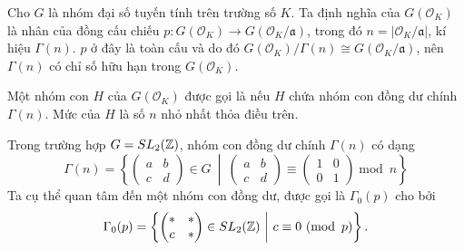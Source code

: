 


\begin{define}
    Cho $G$ là nhóm đại số tuyến tính trên trường số $K$. Ta định nghĩa  của $G(\mathcal{O}_{K})$ là nhân của đồng cấu chiếu $p: G(\mathcal{O}_{K}) \rightarrow G(\mathcal{O}_{K}/\mathfrak{a})$, trong đó $n = |\mathcal{O}_{K}/\mathfrak{a}|$, kí hiệu $\Gamma(n)$. $p$ ở đây là toàn cấu và do đó $G(\mathcal{O}_{K}) / \Gamma(n) \cong G(\mathcal{O}_{K} / \mathfrak{a})$, nên $\Gamma(n)$ có chỉ số hữu hạn trong $G(\mathcal{O}_{K})$.

    Một nhóm con $H$ của $G(\mathcal{O}_{K})$ được gọi là  nếu $H$ chứa nhóm con đồng dư chính $\Gamma(n)$. Mức của $H$ là số $n$ nhỏ nhất thỏa điều trên.
\end{define}

\begin{example}
    Trong trường hợp $G = SL_2(\mathbb Z)$, nhóm con đồng dư chính $\Gamma(n)$ có dạng
    $$
        \Gamma(n) = \left\{ \begin{pmatrix}
            a & b \\
            c & d
        \end{pmatrix} \in G\ \middle|\ \begin{pmatrix}
            a & b \\
            c & d
        \end{pmatrix} \equiv \begin{pmatrix}
            1 & 0 \\
            0 & 1
        \end{pmatrix} \operatorname*{mod}\ n \right\}
    $$
    Ta cụ thể quan tâm đến một nhóm con đồng dư, được gọi là  $\Gamma_0(p)$ cho bởi
    $$
        \Gamma_0(p) = \left\{ \begin{pmatrix}
            * & * \\
            c & *
        \end{pmatrix} \in SL_2(\Z)\ \middle|\ c \equiv 0\ (\operatorname*{mod}\ p) \right\}.
    $$
\end{example}

